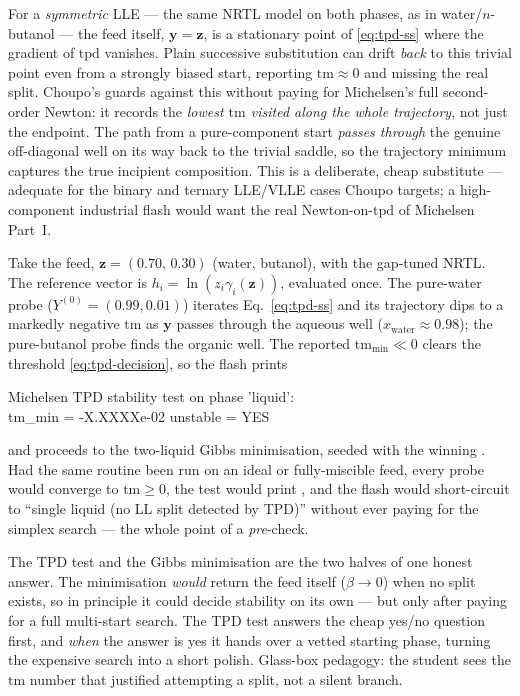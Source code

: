 \documentclass[11pt,a4paper]{article}
\newcommand{\yv}{\mathbf{y}}
\newcommand{\zv}{\mathbf{z}}
\begin{document}
\begin{pitfall}
For a \emph{symmetric} LLE --- the same NRTL model on both phases, as
in water/$n$-butanol --- the feed itself, $\yv = \zv$, is a stationary
point of \eqref{eq:tpd-ss} where the gradient of $\mathrm{tpd}$
vanishes.  Plain successive substitution can drift \emph{back} to this
trivial point even from a strongly biased start, reporting
$\mathrm{tm} \approx 0$ and missing the real split.  Choupo's
 guards against this without paying for Michelsen's
full second-order Newton: it records the \emph{lowest $\mathrm{tm}$
visited along the whole trajectory}, not just the endpoint.  The path
from a pure-component start \emph{passes through} the genuine
off-diagonal well on its way back to the trivial saddle, so the
trajectory minimum captures the true incipient composition.  This is a
deliberate, cheap substitute --- adequate for the binary and ternary
LLE/VLLE cases Choupo targets; a high-component industrial flash would
want the real Newton-on-$\mathrm{tpd}$ of Michelsen Part~I.
\end{pitfall}

\begin{example}
Take the  feed, $\zv = (0.70,\,0.30)$
(water, butanol), with the gap-tuned NRTL.  The reference vector is
$h_i = \ln(z_i\gamma_i(\zv))$, evaluated once.  The pure-water probe
($Y^{(0)} = (0.99, 0.01)$) iterates Eq.~\eqref{eq:tpd-ss} and its
trajectory dips to a markedly negative $\mathrm{tm}$ as $\yv$ passes
through the aqueous well ($x_{\mathrm{water}} \approx 0.98$); the
pure-butanol probe finds the organic well.  The reported
$\mathrm{tm}_{\min} \ll 0$ clears the threshold
\eqref{eq:tpd-decision}, so the flash prints
\begin{center}\small\ttfamily
Michelsen TPD stability test on phase 'liquid':\\
\quad tm\_min = -X.XXXXe-02 \quad unstable = YES
\end{center}
and proceeds to the two-liquid Gibbs minimisation, seeded with the
winning .  Had the same routine been run on an ideal or
fully-miscible feed, every probe would converge to $\mathrm{tm}\ge 0$,
the test would print , and the flash would
short-circuit to ``single liquid (no LL split detected by TPD)''
without ever paying for the simplex search --- the whole point of a
\emph{pre}-check.
\end{example}

\begin{intuition}
The TPD test and the Gibbs minimisation are the two halves of one
honest answer.  The minimisation \emph{would} return the feed itself
($\beta\to0$) when no split exists, so in principle it could decide
stability on its own --- but only after paying for a full multi-start
search.  The TPD test answers the cheap yes/no question first, and
\emph{when} the answer is yes it hands over a vetted starting phase,
turning the expensive search into a short polish.  Glass-box pedagogy:
the student sees the $\mathrm{tm}$ number that justified attempting a
split, not a silent branch.
\end{intuition}
\end{document}
